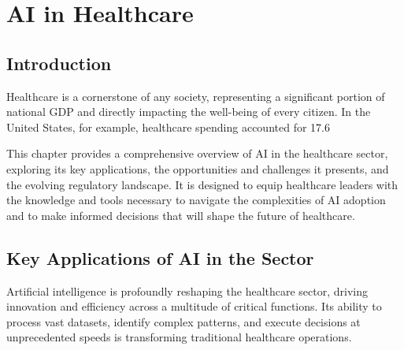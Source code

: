 \chapter{AI in Healthcare}
\label{cha:ai_in_healthcare}

\section{Introduction}

Healthcare is a cornerstone of any society, representing a significant portion of national GDP and directly impacting the well-being of every citizen. In the United States, for example, healthcare spending accounted for 17.6%

This chapter provides a comprehensive overview of AI in the healthcare sector, exploring its key applications, the opportunities and challenges it presents, and the evolving regulatory landscape. It is designed to equip healthcare leaders with the knowledge and tools necessary to navigate the complexities of AI adoption and to make informed decisions that will shape the future of healthcare.

\section{Key Applications of AI in the Sector}

Artificial intelligence is profoundly reshaping the healthcare sector, driving innovation and efficiency across a multitude of critical functions. Its ability to process vast datasets, identify complex patterns, and execute decisions at unprecedented speeds is transforming traditional healthcare operations.


